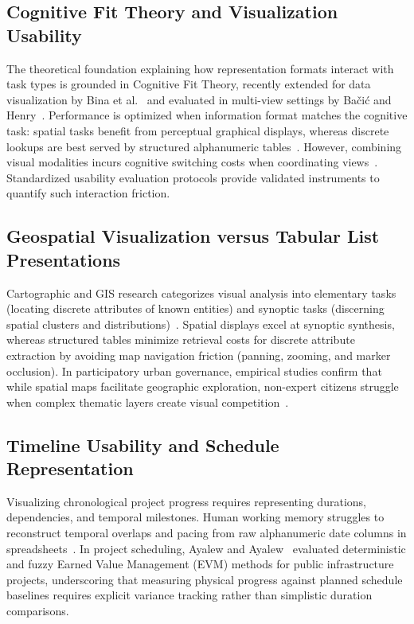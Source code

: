 \documentclass[runningheads]{llncs}
\begin{document}
\subsection{Cognitive Fit Theory and Visualization Usability}
The theoretical foundation explaining how representation formats interact with task types is grounded in Cognitive Fit Theory, recently extended for data visualization by Bina et al.~\cite{bina2023incorporating} and evaluated in multi-view settings by Ba{\v{c}}i{\'c} and Henry~\cite{bacic2022advancing}. Performance is optimized when information format matches the cognitive task: spatial tasks benefit from perceptual graphical displays, whereas discrete lookups are best served by structured alphanumeric tables~\cite{bina2023incorporating,soni2024survey}. However, combining visual modalities incurs cognitive switching costs when coordinating views~\cite{zytek2022sibyl,soni2024survey}. Standardized usability evaluation protocols provide validated instruments to quantify such interaction friction.

\subsection{Geospatial Visualization versus Tabular List Presentations}
Cartographic and GIS research categorizes visual analysis into elementary tasks (locating discrete attributes of known entities) and synoptic tasks (discerning spatial clusters and distributions)~\cite{kytta2023prioritizing,lehto2022landscape}. Spatial displays excel at synoptic synthesis, whereas structured tables minimize retrieval costs for discrete attribute extraction by avoiding map navigation friction (panning, zooming, and marker occlusion). In participatory urban governance, empirical studies confirm that while spatial maps facilitate geographic exploration, non-expert citizens struggle when complex thematic layers create visual competition~\cite{lehto2022landscape,kytta2023prioritizing,johnson2024enhancing}.

\subsection{Timeline Usability and Schedule Representation}
Visualizing chronological project progress requires representing durations, dependencies, and temporal milestones. Human working memory struggles to reconstruct temporal overlaps and pacing from raw alphanumeric date columns in spreadsheets~\cite{soni2024survey}. In project scheduling, Ayalew and Ayalew~\cite{ayalew2024developing} evaluated deterministic and fuzzy Earned Value Management (EVM) methods for public infrastructure projects, underscoring that measuring physical progress against planned schedule baselines requires explicit variance tracking rather than simplistic duration comparisons.
\end{document}

